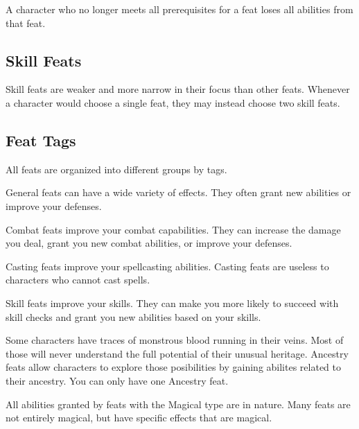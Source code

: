         A character who no longer meets all prerequisites for a feat loses all abilities from that feat.

    \subsection{Skill Feats}
        Skill feats are weaker and more narrow in their focus than other feats.
        Whenever a character would choose a single feat, they may instead choose two skill feats.

    \subsection{Feat Tags}
        All feats are organized into different groups by tags.

         General feats can have a wide variety of effects.
        They often grant new abilities or improve your defenses.

         Combat feats improve your combat capabilities.
        They can increase the damage you deal, grant you new combat abilities, or improve your defenses.

         Casting feats improve your spellcasting abilities.
        Casting feats are useless to characters who cannot cast spells.

         Skill feats improve your skills.
        They can make you more likely to succeed with skill checks and grant you new abilities based on your skills.

         Some characters have traces of monstrous blood running in their veins.
        Most of those will never understand the full potential of their unusual heritage.
        Ancestry feats allow characters to explore those posibilities by gaining abilites related to their ancestry.
        You can only have one Ancestry feat.

        All abilities granted by feats with the Magical type are \magical in nature.
        Many feats are not entirely magical, but have specific effects that are magical.

